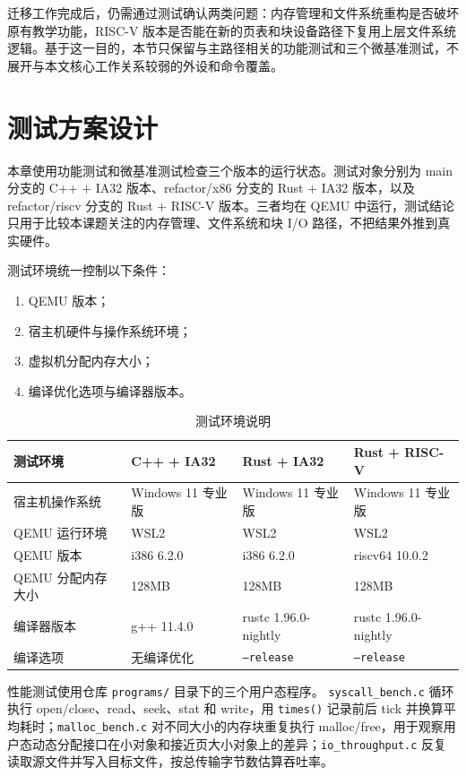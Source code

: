 \par
迁移工作完成后，仍需通过测试确认两类问题：内存管理和文件系统重构是否破坏原有教学功能，RISC-V 版本是否能在新的页表和块设备路径下复用上层文件系统逻辑。基于这一目的，本节只保留与主路径相关的功能测试和三个微基准测试，不展开与本文核心工作关系较弱的外设和命令覆盖。

\section{测试方案设计}

本章使用功能测试和微基准测试检查三个版本的运行状态。测试对象分别为 main 分支的 C++ + IA32 版本、refactor/x86 分支的 Rust + IA32 版本，以及 refactor/riscv 分支的 Rust + RISC-V 版本。三者均在 QEMU 中运行，测试结论只用于比较本课题关注的内存管理、文件系统和块 I/O 路径，不把结果外推到真实硬件。

测试环境统一控制以下条件：

\begin{enumerate}
  \item QEMU 版本；
  \item 宿主机硬件与操作系统环境；
  \item 虚拟机分配内存大小；
  \item 编译优化选项与编译器版本。
\end{enumerate}

\begin{table}[htbp]
  \centering
  \caption{测试环境说明}
  \begin{tabular}{p{}p{}p{}p{}}
    \toprule
    \textbf{测试环境} & \textbf{C++ + IA32} & \textbf{Rust + IA32} & \textbf{Rust + RISC-V} \\
    \midrule
    宿主机操作系统 & Windows 11 专业版 & Windows 11 专业版 & Windows 11 专业版 \\
    QEMU 运行环境 & WSL2 & WSL2 & WSL2 \\
    QEMU 版本 & i386 6.2.0 & i386 6.2.0 & riscv64 10.0.2 \\
    QEMU 分配内存大小 & 128MB & 128MB & 128MB \\
    编译器版本 & g++ 11.4.0 & rustc 1.96.0-nightly & rustc 1.96.0-nightly \\
    编译选项 & 无编译优化 & \texttt{--release} & \texttt{--release} \\
    \bottomrule
  \end{tabular}
\end{table}

性能测试使用仓库 \texttt{programs/} 目录下的三个用户态程序。 \texttt{syscall\_bench.c} 循环执行 open/close、read、seek、stat 和 write，用 \texttt{times()} 记录前后 tick 并换算平均耗时；\texttt{malloc\_bench.c} 对不同大小的内存块重复执行 malloc/free，用于观察用户态动态分配接口在小对象和接近页大小对象上的差异；\texttt{io\_throughput.c} 反复读取源文件并写入目标文件，按总传输字节数估算吞吐率。

